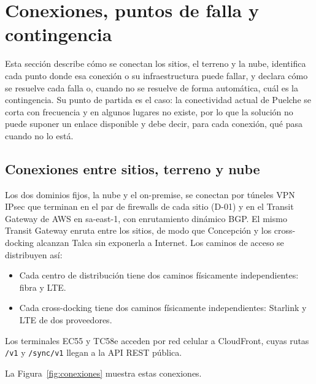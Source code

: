%

\section{Conexiones, puntos de falla y contingencia}
\label{sec:conexiones}

Esta sección describe cómo se conectan los sitios, el terreno y la nube, identifica cada punto donde esa conexión o su infraestructura puede fallar, y declara cómo se resuelve cada falla o, cuando no se resuelve de forma automática, cuál es la contingencia. Su punto de partida es el caso: la conectividad actual de Puelche se corta con frecuencia y en algunos lugares no existe, por lo que la solución no puede suponer un enlace disponible y debe decir, para cada conexión, qué pasa cuando no lo está.

\subsection{Conexiones entre sitios, terreno y nube}

Los dos dominios fijos, la nube y el on-premise, se conectan por túneles VPN IPsec que terminan en el par de firewalls de cada sitio (D-01) y en el Transit Gateway de AWS en sa-east-1, con enrutamiento dinámico BGP. El mismo Transit Gateway enruta entre los sitios, de modo que Concepción y los cross-docking alcanzan Talca sin exponerla a Internet. Los caminos de acceso se distribuyen así:

\begin{itemize}
  \item Cada centro de distribución tiene dos caminos físicamente independientes: fibra y LTE.
  \item Cada cross-docking tiene dos caminos físicamente independientes: Starlink y LTE de dos proveedores.
\end{itemize}

Los terminales EC55 y TC58e acceden por red celular a CloudFront, cuyas rutas \texttt{/v1} y \texttt{/sync/v1} llegan a la API REST pública.

La Figura~\ref{fig:conexiones} muestra estas conexiones.

